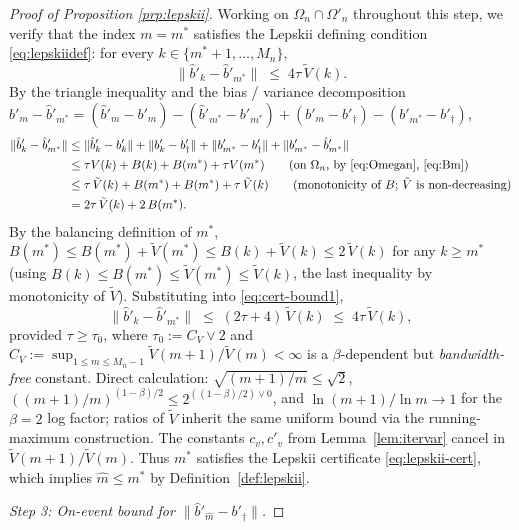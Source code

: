 \begin{proof}[Proof of Proposition \ref{prp:lepskii}]
Working on $\Omega_n \cap \Omega'_n$ throughout this step, we verify that the
index $m = m^*$ satisfies the Lepskii defining condition
\eqref{eq:lepskiidef}: for every $k \in \{m^* + 1, \ldots, M_n\}$,
\begin{equation}\label{eq:lepskii-cert}
\|\hat b'_k - \hat b'_{m^*}\| \;\le\; 4\tau\,\tilde V(k).
\end{equation}
By the triangle inequality and the bias / variance decomposition
$\hat b'_m - \hat b'_{m^*} = (\hat b'_m - b'_m) - (\hat b'_{m^*} - b'_{m^*})
+ (b'_m - b'_\dagger) - (b'_{m^*} - b'_\dagger)$,
\begin{align}
\|\hat b'_k - \hat b'_{m^*}\|
&\le \|\hat b'_k - b'_k\| + \|b'_k - b'_\dagger\|
   + \|b'_{m^*} - b'_\dagger\| + \|b'_{m^*} - \hat b'_{m^*}\| \nonumber\\
&\le \tau V(k) + B(k) + B(m^*) + \tau V(m^*)
   \qquad\text{(on $\Omega_n$, by \eqref{eq:Omegan}, \eqref{eq:Bm})} \nonumber\\
&\le \tau\,\tilde V(k) + B(m^*) + B(m^*) + \tau\,\tilde V(k)
   \qquad\text{(monotonicity of $B$; $\tilde V$ is non-decreasing)} \nonumber\\
&= 2\tau\,\tilde V(k) + 2\,B(m^*).
   \label{eq:cert-bound1}
\end{align}
By the balancing definition of $m^*$, $B(m^*) \le B(m^*) + \tilde V(m^*)
\le B(k) + \tilde V(k) \le 2\,\tilde V(k)$ for any $k \ge m^*$ (using
$B(k) \le B(m^*) \le \tilde V(m^*) \le \tilde V(k)$, the last inequality by
monotonicity of $\tilde V$). Substituting into \eqref{eq:cert-bound1},
\begin{equation}\label{eq:cert-bound2}
\|\hat b'_k - \hat b'_{m^*}\| \;\le\; (2\tau + 4)\,\tilde V(k)
\;\le\; 4\tau\,\tilde V(k),
\end{equation}
provided $\tau \ge \tau_0$, where
$\tau_0 := C_V \vee 2$ and
$C_V := \sup_{1 \le m \le M_n - 1}\tilde V(m+1)/\tilde V(m) < \infty$ is
a $\beta$-dependent but \emph{bandwidth-free} constant. Direct
calculation: $\sqrt{(m+1)/m} \le \sqrt 2$,
$((m+1)/m)^{(1-\beta)/2} \le 2^{((1-\beta)/2)\vee 0}$, and
$\ln(m+1)/\ln m \to 1$ for the $\beta = 2$ log factor; ratios of
$\tilde V$ inherit the same uniform bound via the running-maximum
construction. The constants $c_v, c'_v$ from
Lemma~\ref{lem:itervar} cancel in $\tilde V(m+1)/\tilde V(m)$.
Thus $m^*$ satisfies the Lepskii certificate \eqref{eq:lepskii-cert}, which
implies $\hat m \le m^*$ by Definition~\ref{def:lepskii}.

\smallskip
\emph{Step 3: On-event bound for $\|\hat b'_{\hat m} - b'_\dagger\|$.}


\end{proof}
